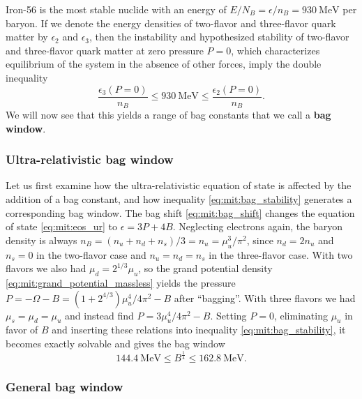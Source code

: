 Iron-56 is the most stable nuclide with an energy of $E/N_B = \epsilon/n_B = \SI{930}{\mega\electronvolt}$ per baryon.
If we denote the energy densities of two-flavor and three-flavor quark matter by $\epsilon_2$ and $\epsilon_3$,
then the instability and hypothesized stability of two-flavor and three-flavor quark matter at zero pressure $P=0$,
which characterizes equilibrium of the system in the absence of other forces,
imply the double inequality
\begin{equation}
	\frac{\epsilon_3(P=0)}{n_B} \leq \SI{930}{\mega\electronvolt} \leq \frac{\epsilon_2(P=0)}{n_B} .
\label{eq:mit:bag_stability}
\end{equation}
We will now see that this yields a range of bag constants that we call a \textbf{bag window}.

\subsubsection{Ultra-relativistic bag window}

Let us first examine how the ultra-relativistic equation of state is affected by the addition of a bag constant,
and how inequality \eqref{eq:mit:bag_stability} generates a corresponding bag window.
The bag shift \eqref{eq:mit:bag_shift} changes the equation of state \eqref{eq:mit:eos_ur} to $\epsilon = 3 P + 4 B$.
Neglecting electrons again, the baryon density is always $n_B = (n_u+n_d+n_s)/3 = n_u = \mu_u^3 / \pi^2$,
since $n_d = 2 n_u$ and $n_s=0$ in the two-flavor case and $n_u=n_d=n_s$ in the three-flavor case.
With two flavors we also had $\mu_d = 2^{1/3} \mu_u$,
so the grand potential density \eqref{eq:mit:grand_potential_massless}
yields the pressure $P = -\Omega - B = (1 + 2^{4/3}) \mu_u^4 / 4 \pi^2 - B$ after ``bagging''.
With three flavors we had $\mu_s = \mu_d = \mu_u$ and instead find $P = 3 \mu_u^4 / 4 \pi^2 - B$.
Setting $P=0$, eliminating $\mu_u$ in favor of $B$ and inserting these relations into inequality \eqref{eq:mit:bag_stability},
it becomes exactly solvable and gives the bag window
\begin{equation}
	\SI{144.4}{\mega\electronvolt} \leq B^\frac14 \leq \SI{162.8}{\mega\electronvolt}.
\label{eq:mit:bag_window_ur}
\end{equation}

\subsubsection{General bag window}

